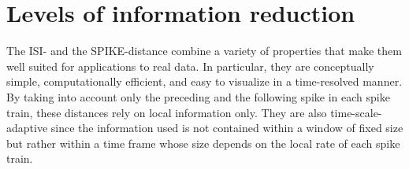 \documentclass[10pt,twocolumn]{elsart5p}
\begin{document}
%

\section{\label{s:Information-reduction} Levels of information reduction}

The ISI- and the SPIKE-distance combine a variety of properties that make them well suited for applications to real data. In particular, they are conceptually simple, computationally efficient, and easy to visualize in a time-resolved manner. By taking into account only the preceding and the following spike in each spike train, these distances rely on local information only. They are also time-scale-adaptive since the information used is not contained within a window of fixed size but rather within a time frame whose size depends on the local rate of each spike train.
\end{document}
